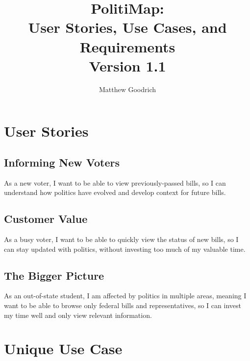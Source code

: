 \documentclass[11pt,oneside,letterpaper]{article}   	%
\begin{document}
\title{\bfseries PolitiMap: \\User Stories, Use Cases, and Requirements\\
Version 1.1}
\author{Matthew Goodrich}


\maketitle \thispagestyle{empty}

\pagebreak
\tableofcontents
\pagebreak

\newpage

\section{User Stories}
\subsection{Informing New Voters}
As a new voter, I want to be able to view previously-passed bills, so I can understand how politics have evolved and develop context for future bills.

\subsection{Customer Value}
As a busy voter, I want to be able to quickly view the status of new bills, so I can stay updated with politics, without investing too much of my valuable time.

\subsection{The Bigger Picture}
As an out-of-state student, I am affected by politics in multiple areas, meaning I want to be able to browse only federal bills and representatives, so I can invest my time well and only view relevant information.

\section{Unique Use Case}
\end{document}
